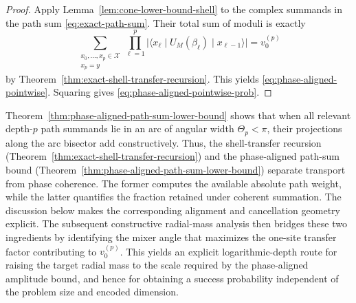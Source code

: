 \documentclass[a4paper,onecolumn,11pt,unpublished]{quantumarticle}
\theoremstyle{remark}
\begin{document}
\begin{proof}
Apply Lemma~\ref{lem:cone-lower-bound-shell} to the complex summands in the
path sum \eqref{eq:exact-path-sum}. Their total sum of moduli is exactly
\[
\sum_{\substack{x_0,\dots,x_p\in \mathcal X\\ x_p=y}}
\prod_{\ell=1}^{p}
\bigl|\langle x_\ell\mid U_M(\beta_\ell)\mid x_{\ell-1}\rangle\bigr|
=
v_0^{(p)}
\]
by Theorem~\ref{thm:exact-shell-transfer-recursion}. This yields
\eqref{eq:phase-aligned-pointwise}. Squaring gives
\eqref{eq:phase-aligned-pointwise-prob}.
\end{proof}



Theorem~\ref{thm:phase-aligned-path-sum-lower-bound} shows that when all
relevant depth-\(p\) path summands lie in an arc of angular width
\(\Theta_p<\pi\), their projections along the arc bisector add
constructively. Thus, the shell-transfer recursion
(Theorem~\ref{thm:exact-shell-transfer-recursion}) and the phase-aligned
path-sum bound
(Theorem~\ref{thm:phase-aligned-path-sum-lower-bound}) separate
transport from phase coherence. The former computes the available
absolute path weight, while the latter quantifies the fraction retained
under coherent summation. The discussion below makes the corresponding
alignment and cancellation geometry explicit. The subsequent
constructive radial-mass analysis then bridges these two ingredients by
identifying the mixer angle that maximizes the one-site transfer factor
contributing to \(v_0^{(p)}\). This yields an explicit logarithmic-depth
route for raising the target radial mass to the scale required by the
phase-aligned amplitude bound, and hence for obtaining a success
probability independent of the problem size and encoded dimension.
\end{document}
